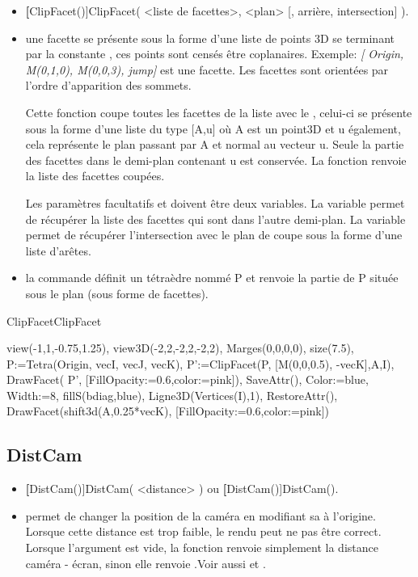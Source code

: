 \begin{itemize}
 \item \util \textbf[ClipFacet()]{ClipFacet( <liste de facettes>, <plan> [, arrière, intersection] )}.
 \item \desc une facette se présente sous la forme d'une liste de points 3D se terminant par la constante \jump, ces points sont censés être coplanaires. Exemple: \textsl{[ Origin, M(0,1,0), M(0,0,3), jump]} est une facette. Les facettes sont orientées par l'ordre d'apparition des sommets.

 Cette fonction coupe toutes les facettes de la liste avec le , celui-ci se présente sous la forme d'une liste du type [A,u] où A est un point3D et u également, cela représente le plan passant par A et normal au vecteur u. Seule la partie des facettes dans le demi-plan contenant u est conservée. La fonction renvoie la liste des facettes coupées. 
 
 Les paramètres facultatifs  et  doivent être deux variables. La variable  permet de récupérer 
 la liste des facettes qui sont dans l'autre demi-plan. La variable  permet de récupérer l'intersection avec le plan de coupe sous la forme d'une liste d'arêtes.
  
 \item \exem la commande \co{[P:=Tetra(Origin, vecI, vecJ, vecK), ClipFacet(P, [M(0,0,0.5), -vecK])]} définit un tétraèdre nommé P et renvoie la partie de P située sous le plan (sous forme de facettes).
\end{itemize}

\begin{demo}{ClipFacet}{ClipFacet}
\begin{texgraph}[name=ClipFacet]
 view(-1,1,-0.75,1.25), view3D(-2,2,-2,2,-2,2),
 Marges(0,0,0,0), size(7.5),
 P:=Tetra(Origin, vecI, vecJ, vecK),
 P':=ClipFacet(P, [M(0,0,0.5), -vecK],A,I),
 DrawFacet( P', [FillOpacity:=0.6,color:=pink]),
 SaveAttr(),
 Color:=blue, Width:=8, fillS(bdiag,blue),
 Ligne3D(Vertices(I),1),
 RestoreAttr(),
 DrawFacet(shift3d(A,0.25*vecK), 
   [FillOpacity:=0.6,color:=pink])
\end{texgraph}
\end{demo}


\subsection{DistCam}\label{cmdDistCam}

\begin{itemize}
 \item \util \textbf[DistCam()]{DistCam( <distance> )} ou \textbf[DistCam()]{DistCam()}.
 \item \desc permet de changer la position de la caméra en modifiant sa  à l'origine. Lorsque cette distance est trop faible, le rendu peut ne pas être correct. Lorsque l'argument est vide, la fonction renvoie simplement la distance caméra - écran, sinon elle renvoie \Nil.Voir aussi  et .
\end{itemize}


